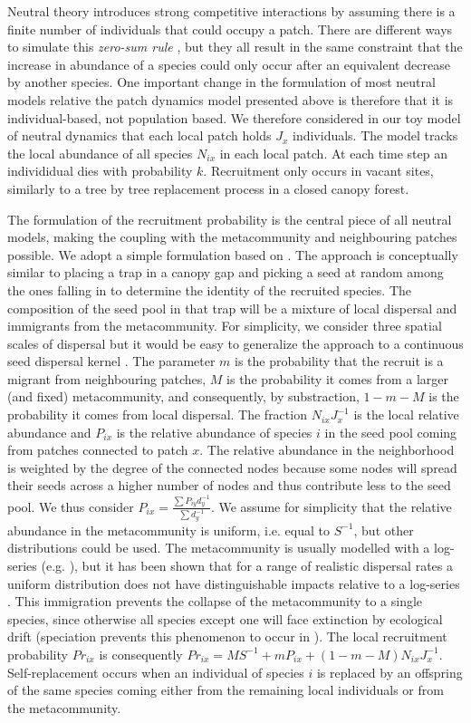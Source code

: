 \documentclass[12pt]{article}
\begin{document}
Neutral theory introduces strong competitive interactions by assuming there is a
finite number of individuals that could occupy a patch. There are different ways
to simulate this \emph{zero-sum rule} \parencite{Bell2000,Hubbell2001}, but they
all result in the same constraint that the increase in abundance of a species
could only occur after an equivalent decrease by another species. One important
change in the formulation of most neutral models relative the patch dynamics
model presented above is therefore that it is individual-based, not population
based. We therefore considered in our toy model of neutral dynamics that each
local patch holds $J_x$ individuals. The model tracks the local abundance of all
species $N_{ix}$ in each local patch. At each time step an individidual dies
with probability $k$. Recruitment only occurs in vacant sites, similarly to a
tree by tree replacement process in a closed canopy forest.

The formulation of the recruitment probability is the central piece of all
neutral models, making the coupling with the metacommunity and
neighbouring patches possible. We adopt a simple formulation based on
\parencite{Gravel2006}. The approach is conceptually similar to placing a trap
in a canopy gap and picking a seed at random among the ones falling in to
determine the identity of the recruited species. The composition of the seed
pool in that trap will be a mixture of local dispersal and immigrants from the
metacommunity. For simplicity, we consider three spatial scales of dispersal but
it would be easy to generalize the approach to a continuous seed dispersal
kernel \parencite{Gravel2006}. The parameter $m$ is the probability that the
recruit is a migrant from neighbouring patches, $M$ is the probability it comes
from a larger (and fixed) metacommunity, and consequently, by substraction,
$1-m-M$ is the probability it comes from local dispersal. The fraction
$N_{ix}J_x^{-1}$ is the local relative abundance and $P_{ix}$ is the relative
abundance of species $i$ in the seed pool coming from patches connected to patch $x$.
The relative abundance in the neighborhood is weighted by the degree of the
connected nodes because some nodes will spread their seeds across a higher
number of nodes and thus contribute less to the seed pool. We thus consider
$P_{ix} =\frac{\sum P_{iy}d_y^{-1}}{\sum d_y^{-1}}$. We assume for simplicity
that the relative abundance in the metacommunity is uniform, i.e. equal to
$S^{-1}$, but other distributions could be used. The metacommunity is usually
modelled with a log-series (e.g. \textcite{Hubbell2001}), but it has been shown
that for a range of realistic dispersal rates a uniform distribution does not
have distinguishable impacts relative to a log-series \parencite{Bell2000}. This
immigration prevents the collapse of the metacommunity to a single species,
since otherwise all species except one will face extinction by ecological drift
(speciation prevents this phenomenon to occur in \textcite{Hubbell2001}). The
local recruitment probability $Pr_{ix}$ is consequently $Pr_{ix} = MS^{-1} +
mP_{ix} + (1-m-M)N_{ix}J_x^{-1}$. Self-replacement occurs when an individual of
species $i$ is replaced by an offspring of the same species coming either from
the remaining local individuals or from the metacommunity.
\end{document}
